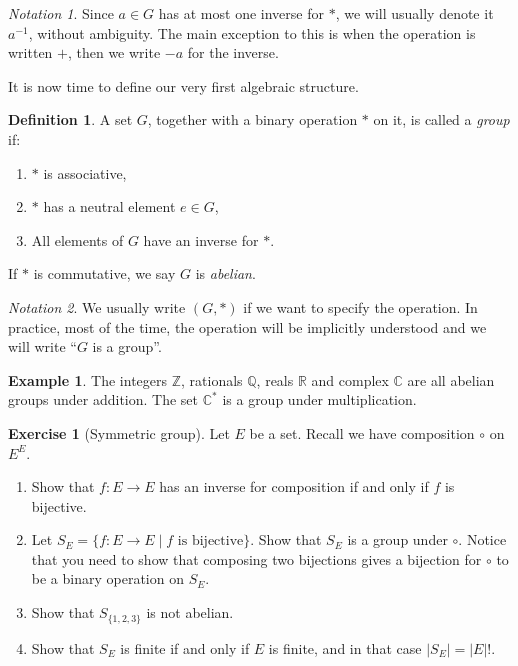 \documentclass{book}
\newcommand{\Z}{\mathbb{Z}}
\newcommand{\Q}{\mathbb{Q}}
\newcommand{\R}{\mathbb{R}}
\newcommand{\C}{\mathbb{C}}
\theoremstyle{plain}
\theoremstyle{definition}
\newtheorem{definition}[theorem]{Definition}
\newtheorem{example}[theorem]{Example}
\newtheorem{exercise}{Exercise}[section]
\theoremstyle{remark}
\newtheorem*{notation}{Notation}
\begin{document}
\begin{notation}
    Since $a \in G$ has at most one inverse for $*$, we will usually denote it $a^{-1}$, without ambiguity. The main exception to this is when the operation is written $+$, then we write $-a$ for the inverse.
\end{notation}

It is now time to define our very first algebraic structure.

\begin{definition}
    A set $G$, together with a binary operation $*$ on it, is called a \emph{group} if:
    \begin{enumerate}
        \item $*$ is associative,
        \item $*$ has a neutral element $e \in G$,
        \item All elements of $G$ have an inverse for $*$.
    \end{enumerate}
    If $*$ is commutative, we say $G$ is \emph{abelian}.
\end{definition}

\begin{notation}
    We usually write $(G,*)$ if we want to specify the operation. In practice, most of the time, the operation will be implicitly understood and we will write ``$G$ is a group''.
\end{notation}

\begin{example}
    The integers $\Z$, rationals $\Q$, reals $\R$ and complex $\C$ are all abelian groups under addition. The set $\C^*$ is a group under multiplication.
\end{example}

\begin{exercise}[Symmetric group]
    Let $E$ be a set. Recall we have composition $\circ$ on $E^E$.
    \begin{enumerate}
        \item Show that $f : E \to E$ has an inverse for composition if and only if $f$ is bijective.
        \item Let $S_E = \{f : E \to E\mid f \text{ is bijective}\}$. Show that $S_E$ is a group under $\circ$. Notice that you need to show that composing two bijections gives a bijection for $\circ$ to be a binary operation on $S_E$.
        \item Show that $S_{\{1,2,3\}}$ is not abelian.
        \item Show that $S_E$ is finite if and only if $E$ is finite, and in that case $|S_E| = |E|!$.
    \end{enumerate}
\end{exercise}
\end{document}
